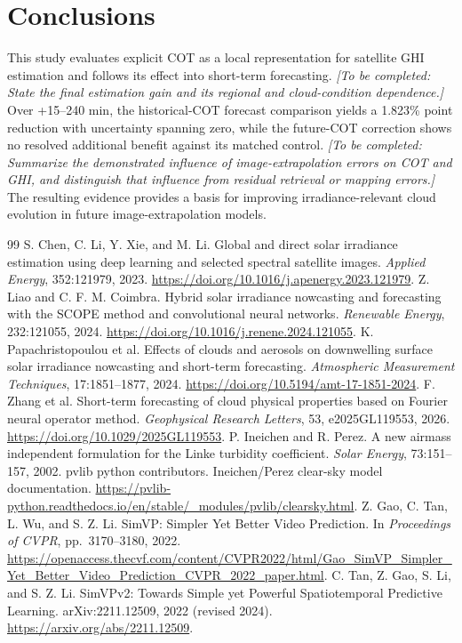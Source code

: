 \documentclass[11pt]{article}
\newcommand{\pending}[1]{{\color{pendingcolor}\textit{[To be completed: #1]}}}
\begin{document}
\section{Conclusions}
This study evaluates explicit COT as a local representation for satellite GHI estimation and follows its effect into short-term forecasting. \pending{State the final estimation gain and its regional and cloud-condition dependence.} Over +15--240 min, the historical-COT forecast comparison yields a 1.823\% point reduction with uncertainty spanning zero, while the future-COT correction shows no resolved additional benefit against its matched control. \pending{Summarize the demonstrated influence of image-extrapolation errors on COT and GHI, and distinguish that influence from residual retrieval or mapping errors.} The resulting evidence provides a basis for improving irradiance-relevant cloud evolution in future image-extrapolation models.
\FloatBarrier
\begin{thebibliography}{99}\small
{}
S. Chen, C. Li, Y. Xie, and M. Li.
Global and direct solar irradiance estimation using deep learning and selected spectral satellite images.
\textit{Applied Energy}, 352:121979, 2023.
\url{https://doi.org/10.1016/j.apenergy.2023.121979}.
Z. Liao and C. F. M. Coimbra.
Hybrid solar irradiance nowcasting and forecasting with the SCOPE method and convolutional neural networks.
\textit{Renewable Energy}, 232:121055, 2024.
\url{https://doi.org/10.1016/j.renene.2024.121055}.
K. Papachristopoulou et al.
Effects of clouds and aerosols on downwelling surface solar irradiance nowcasting and short-term forecasting.
\textit{Atmospheric Measurement Techniques}, 17:1851--1877, 2024.
\url{https://doi.org/10.5194/amt-17-1851-2024}.
F. Zhang et al.
Short-term forecasting of cloud physical properties based on Fourier neural operator method.
\textit{Geophysical Research Letters}, 53, e2025GL119553, 2026.
\url{https://doi.org/10.1029/2025GL119553}.
P. Ineichen and R. Perez.
A new airmass independent formulation for the Linke turbidity coefficient.
\textit{Solar Energy}, 73:151--157, 2002.
pvlib python contributors.
Ineichen/Perez clear-sky model documentation.
\url{https://pvlib-python.readthedocs.io/en/stable/_modules/pvlib/clearsky.html}.
Z. Gao, C. Tan, L. Wu, and S. Z. Li.
SimVP: Simpler Yet Better Video Prediction.
In \textit{Proceedings of CVPR}, pp.~3170--3180, 2022.
\url{https://openaccess.thecvf.com/content/CVPR2022/html/Gao_SimVP_Simpler_Yet_Better_Video_Prediction_CVPR_2022_paper.html}.
C. Tan, Z. Gao, S. Li, and S. Z. Li.
SimVPv2: Towards Simple yet Powerful Spatiotemporal Predictive Learning.
arXiv:2211.12509, 2022 (revised 2024).
\url{https://arxiv.org/abs/2211.12509}.
\end{thebibliography}
\end{document}
